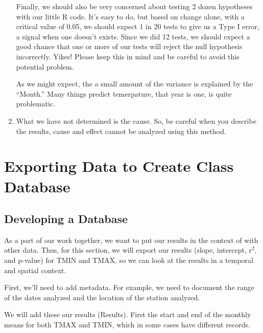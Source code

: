 \documentclass{article}\usepackage[]{graphicx}\usepackage[]{color}
\begin{document}
\begin{enumerate}
Finally, we should also be very concerned about testing 2 dozen hypotheses with our little R code. It's easy to do, but based on change alone, with a critical value of 0.05, we should expect 1 in 20 tests to give us a Type I error, a signal when one doesn't exists. Since we did 12 tests, we should expect a good chance that one or more of our tests will reject the null hypothesis incorrectly. Yikes!  
Please keep this in mind and be careful to avoid this potential problem. 

As we might expect, the a small amount of the variance is explained by the ``Month.'' Many things predict temerpature, that year is one, is quite problematic.

\item What we have not determined is the cause. So, be careful when you describe the results, cause and effect cannot be analyzed using this method.

\end{enumerate}

\section{Exporting Data to Create Class Database}

\subsection{Developing a Database}

As a part of our work together, we want to put our results in the context of with other data. Thus, for this section, we will export our results (slope, intercept, r$^2$, and p-value) for TMIN and TMAX, so we can look at the results in a temporal and spatial context. 

First, we'll need to add metadata. For example, we need to document the range of the dates analyzed and the location of the station analyzed. 

We will add these our results (Results). First the start and end of the monthly means for both TMAX and TMIN, which in some cases have different records. 
\end{document}
